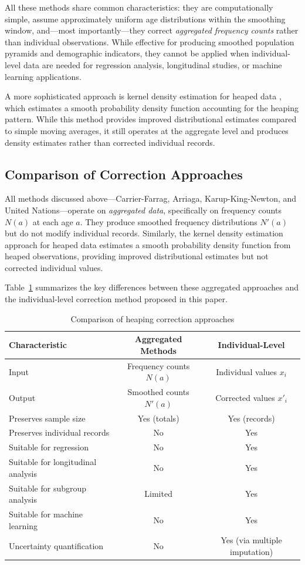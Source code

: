 \documentclass[12pt]{article}
\theoremstyle{plain}
\theoremstyle{definition}
\begin{document}
All these methods share common characteristics: they are computationally simple, assume approximately uniform age distributions within the smoothing window, and---most importantly---they correct \emph{aggregated frequency counts} rather than individual observations. While effective for producing smoothed population pyramids and demographic indicators, they cannot be applied when individual-level data are needed for regression analysis, longitudinal studies, or machine learning applications.

A more sophisticated approach is kernel density estimation for heaped data \citep{kernelheaping}, which estimates a smooth probability density function accounting for the heaping pattern. While this method provides improved distributional estimates compared to simple moving averages, it still operates at the aggregate level and produces density estimates rather than corrected individual records.


\subsection{Comparison of Correction Approaches}

All methods discussed above---Carrier-Farrag, Arriaga, Karup-King-Newton, and
United Nations---operate on \emph{aggregated data}, specifically on frequency counts $N(a)$ at each age $a$. They produce smoothed frequency distributions $N'(a)$ but do not modify individual records. Similarly, the kernel density estimation approach for heaped data \citep{kernelheaping} estimates a smooth probability density function from heaped observations, providing improved distributional estimates but not corrected individual values.

Table~\ref{tab:comparison} summarizes the key differences between these aggregated approaches and the individual-level correction method proposed in this paper.

\begin{table}[!htp]
\caption{Comparison of heaping correction approaches}\label{tab:comparison}
\centering
\begin{tabular}{lcc}
\toprule
\textbf{Characteristic} & \textbf{Aggregated Methods} & \textbf{Individual-Level} \\
\midrule
Input & Frequency counts $N(a)$ & Individual values $x_i$ \\
Output & Smoothed counts $N'(a)$ & Corrected values $x'_i$ \\
Preserves sample size & Yes (totals) & Yes (records) \\
Preserves individual records & No & Yes \\
Suitable for regression & No & Yes \\
Suitable for longitudinal analysis & No & Yes \\
Suitable for subgroup analysis & Limited & Yes \\
Suitable for machine learning & No & Yes \\
Uncertainty quantification & No & Yes (via multiple imputation) \\
\bottomrule
\end{tabular}
\end{table}
\end{document}
